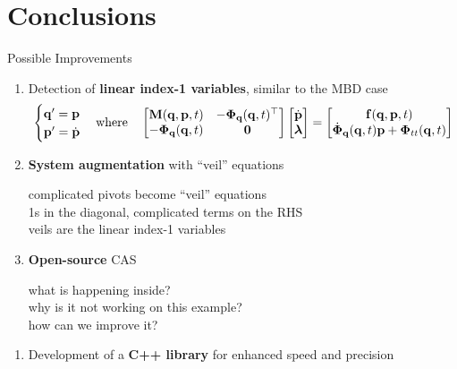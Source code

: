 
\section{Conclusions}

\begin{frame}{Possible Improvements}
    \begin{enumerate}
      \item<1> Detection of \textbf{linear index-1 variables}, similar to the \acs{MBD} case
      \begin{equation*}
        \begin{cases}
          \mathbf{q}^{\prime} = \mathbf{p} \\
          \mathbf{p}^{\prime} = \dot{\mathbf{p}}
        \end{cases}
        \text{where} \quad
        \begin{bmatrix}
          \mathbf{M}(\mathbf{q}, \mathbf{p}, t)      & -\boldsymbol{\Phi}_{\mathbf{q}}(\mathbf{q}, t)^{\top} \\
          -\boldsymbol{\Phi}_{\mathbf{q}}(\mathbf{q}, t) & \mathbf{0}
        \end{bmatrix}
        \begin{bmatrix}
          \dot{\mathbf{p}} \\ \boldsymbol{\lambda}
        \end{bmatrix} = \begin{bmatrix}
          \mathbf{f}(\mathbf{q}, \mathbf{p}, t) \\
          \dot{\boldsymbol{\Phi}}_{\mathbf{q}}(\mathbf{q}, t)\mathbf{p} + \boldsymbol{\Phi}_{tt}(\mathbf{q}, t)
        \end{bmatrix}
      \end{equation*}
      \item<2> \textbf{System augmentation} with ``veil'' equations \\
      \begin{small}
        \qquad complicated pivots become ``veil'' equations \\
        \qquad 1s in the diagonal, complicated terms on the RHS \\
        \qquad veils are the linear index-1 variables
      \end{small}
      \item<3> \textbf{Open-source} \acs{CAS} \\
      \begin{small}
        \qquad what is happening inside? \\
        \qquad why is it not working on this example? \\
        \qquad how can we improve it?
      \end{small}
    \end{enumerate}
    \begin{enumerate}
      \item<4> Development of a \textbf{C++ library} for enhanced speed and precision
    \end{enumerate}
\end{frame}

